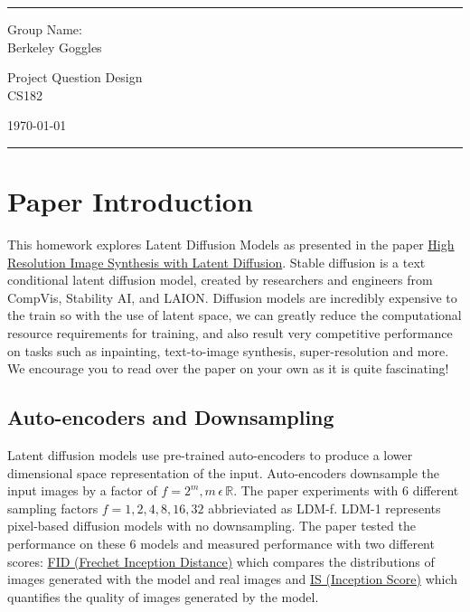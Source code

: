 \documentclass[a4paper]{article}
\begin{document}
\fancyhead[C]{}
\hrule \medskip %
\begin{minipage}{0.295\textwidth} 
\raggedright
\footnotesize
Group Name: \hfill \\
Berkeley Goggles
\end{minipage}
\begin{minipage}{0.4\textwidth} 
\centering 
\large 
Project Question Design\\ 
\normalsize 
CS182\\ 
\end{minipage}
\begin{minipage}{0.295\textwidth} 
\raggedleft
\today\hfill\\
\end{minipage}
\medskip\hrule 
\bigskip
\section{Paper Introduction}
This homework explores Latent Diffusion Models as presented in the paper \href{https://arxiv.org/pdf/2112.10752.pdf}{High Resolution Image Synthesis with Latent Diffusion}. Stable diffusion is a text conditional latent diffusion model, created by researchers and engineers from CompVis, Stability AI, and LAION. Diffusion models are incredibly expensive to the train so with the use of latent space, we can greatly reduce the computational resource requirements for training, and also result very competitive performance on tasks such as inpainting, text-to-image synthesis, super-resolution and more. We encourage you to read over the paper on your own as it is quite fascinating!

\subsection{Auto-encoders and Downsampling}
Latent diffusion models use pre-trained auto-encoders to produce a lower dimensional space representation of the input.
Auto-encoders downsample the input images by a factor of \(f=2^m, m  \, \epsilon \, \mathbb{R}\). The paper experiments with 6 different sampling factors \(f={1, 2, 4, 8, 16, 32}\) abbrieviated as LDM-f. LDM-1 represents pixel-based diffusion models with no downsampling. The paper tested the performance on these 6 models and measured performance with two different scores: \href{https://en.wikipedia.org/wiki/Fr%C3%A9chet_inception_distance}{FID (Frechet Inception Distance)} which compares the distributions of images generated with the model and real images and \href{https://en.wikipedia.org/wiki/Inception_score}{IS (Inception Score)} which quantifies the quality of images generated by the model.
\end{document}
